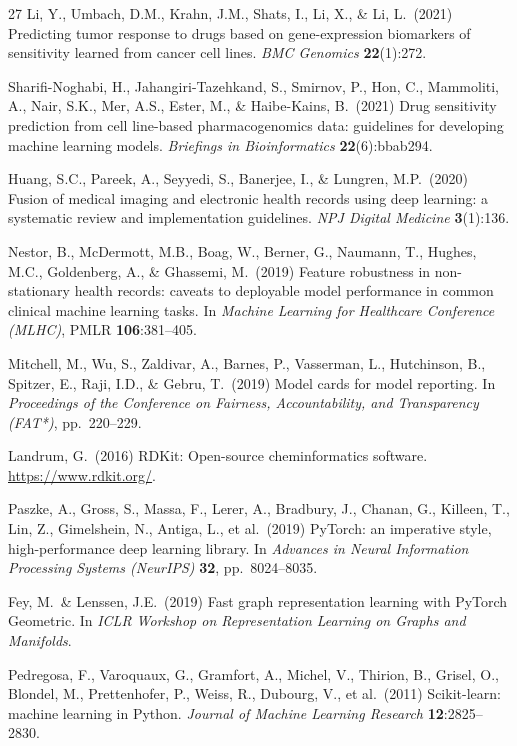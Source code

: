 \documentclass{article}
\begin{document}
\begin{thebibliography}{27}
Li, Y., Umbach, D.M., Krahn, J.M., Shats, I., Li, X., \& Li, L.\ (2021)
Predicting tumor response to drugs based on gene-expression biomarkers of sensitivity learned from cancer cell lines.
\emph{BMC Genomics} \textbf{22}(1):272.

Sharifi-Noghabi, H., Jahangiri-Tazehkand, S., Smirnov, P., Hon, C., Mammoliti, A., Nair, S.K., Mer, A.S., Ester, M., \& Haibe-Kains, B.\ (2021)
Drug sensitivity prediction from cell line-based pharmacogenomics data: guidelines for developing machine learning models.
\emph{Briefings in Bioinformatics} \textbf{22}(6):bbab294.

Huang, S.C., Pareek, A., Seyyedi, S., Banerjee, I., \& Lungren, M.P.\ (2020)
Fusion of medical imaging and electronic health records using deep learning: a systematic review and implementation guidelines.
\emph{NPJ Digital Medicine} \textbf{3}(1):136.

Nestor, B., McDermott, M.B., Boag, W., Berner, G., Naumann, T., Hughes, M.C., Goldenberg, A., \& Ghassemi, M.\ (2019)
Feature robustness in non-stationary health records: caveats to deployable model performance in common clinical machine learning tasks.
In \emph{Machine Learning for Healthcare Conference (MLHC)}, PMLR \textbf{106}:381--405.

Mitchell, M., Wu, S., Zaldivar, A., Barnes, P., Vasserman, L., Hutchinson, B., Spitzer, E., Raji, I.D., \& Gebru, T.\ (2019)
Model cards for model reporting.
In \emph{Proceedings of the Conference on Fairness, Accountability, and Transparency (FAT*)}, pp.\ 220--229.

Landrum, G.\ (2016)
RDKit: Open-source cheminformatics software.
\url{https://www.rdkit.org/}.

Paszke, A., Gross, S., Massa, F., Lerer, A., Bradbury, J., Chanan, G., Killeen, T., Lin, Z., Gimelshein, N., Antiga, L., et al.\ (2019)
PyTorch: an imperative style, high-performance deep learning library.
In \emph{Advances in Neural Information Processing Systems (NeurIPS)} \textbf{32}, pp.\ 8024--8035.

Fey, M.\ \& Lenssen, J.E.\ (2019)
Fast graph representation learning with PyTorch Geometric.
In \emph{ICLR Workshop on Representation Learning on Graphs and Manifolds}.

Pedregosa, F., Varoquaux, G., Gramfort, A., Michel, V., Thirion, B., Grisel, O., Blondel, M., Prettenhofer, P., Weiss, R., Dubourg, V., et al.\ (2011)
Scikit-learn: machine learning in Python.
\emph{Journal of Machine Learning Research} \textbf{12}:2825--2830.

\end{thebibliography}
\end{document}

